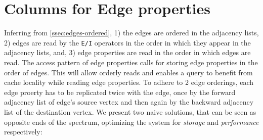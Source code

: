 \section{Columns for Edge properties}
\label{sec:edge-property-columns}

Inferring from \ref{ssec:edges-ordered}, 1) the edges are ordered in the adjacency lists, 2) edges are read by the \texttt{E/I} operators in the order in which they appear in the adjacency lists, and, 3) edge properties are read in the order in which edges are read. The access pattern of edge properties calls for storing edge properties in the order of edges. This will allow orderly reads and enables a query to benefit from cache locality while reading edge properties. To adhere to 2 edge orderings, each edge proerty has to be replicated twice with the edge, once by the forward adjacency list of edge's source vertex and then again by the backward adjacency list of the destination vertex. We present two naive solutions, that can be seen as opposite ends of the spectrum, optimizing the system for \emph{storage} and \emph{performance} respectively:

